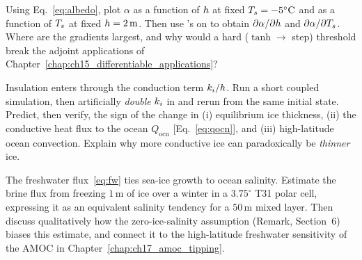 \begin{exercise}
Using Eq.~\eqref{eq:albedo}, plot $\alpha$ as a function of $h$ at fixed
$T_{s}=-5^\circ\mathrm{C}$ and as a function of $T_{s}$ at fixed
$h=2\,\mathrm{m}$. Then use \jax{}'s  on
 to obtain $\partial\alpha/\partial h$ and
$\partial\alpha/\partial T_{s}$. Where are the gradients largest, and why would a
hard ($\tanh\!\to\!$ step) threshold break the adjoint applications of
Chapter~\ref{chap:ch15_differentiable_applications}?
\end{exercise}

\begin{exercise}
Insulation enters through the conduction term $k_{i}/h$. Run a short coupled
simulation, then artificially \emph{double} $k_{i}$ in 
and rerun from the same initial state. Predict, then verify, the sign of the
change in (i) equilibrium ice thickness, (ii) the conductive heat flux to the
ocean $Q_{\mathrm{ocn}}$ [Eq.~\eqref{eq:qocn}], and (iii) high-latitude ocean
convection. Explain why more conductive ice can paradoxically be \emph{thinner}
ice.
\end{exercise}

\begin{exercise}
The freshwater flux~\eqref{eq:fw} ties sea-ice growth to ocean salinity. Estimate
the brine flux from freezing $1\,\mathrm{m}$ of ice over a winter in a
$3.75^\circ$ T31 polar cell, expressing it as an equivalent salinity tendency for
a $50\,\mathrm{m}$ mixed layer. Then discuss qualitatively how the zero-ice-salinity
assumption (Remark, Section~6) biases this estimate, and connect it to the
high-latitude freshwater sensitivity of the AMOC in
Chapter~\ref{chap:ch17_amoc_tipping}.
\end{exercise}

